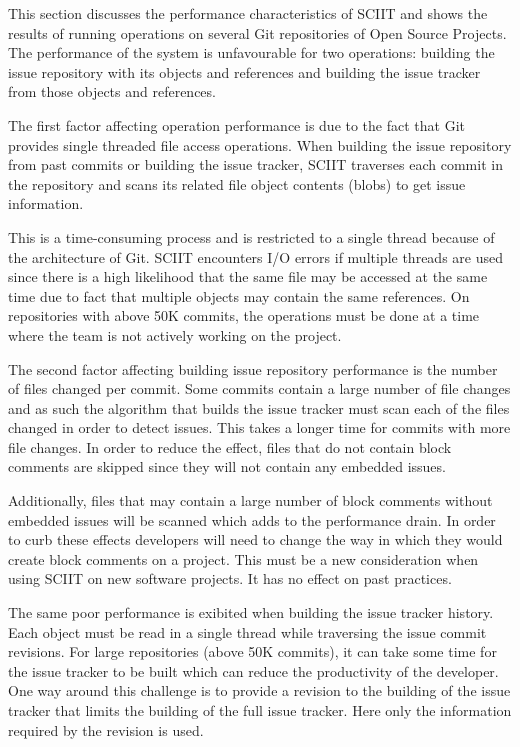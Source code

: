 \documentclass{mproj}
\begin{document}
This section discusses the performance characteristics of SCIIT and shows the results of running operations on several Git repositories of Open Source Projects. The performance of the system is unfavourable for two operations: building the issue repository with its objects and references and building the issue tracker from those objects and references. 

The first factor affecting operation performance is due to the fact that Git provides single threaded file access operations. When building the issue repository from past commits or building the issue tracker, SCIIT traverses each commit in the repository and scans its related file object contents (blobs) to get issue information. 

This is a time-consuming process and is restricted to a single thread because of the architecture of Git. SCIIT encounters I/O errors if multiple threads are used since there is a high likelihood that the same file may be accessed at the same time due to fact that multiple objects may contain the same references. On repositories with above 50K commits, the operations must be done at a time where the team is not actively working on the project.

The second factor affecting building issue repository performance is the number of files changed per commit. Some commits contain a large number of file changes and as such the algorithm that builds the issue tracker must scan each of the files changed in order to detect issues. This takes a longer time for commits with more file changes. In order to reduce the effect, files that do not contain block comments are skipped since they will not contain any embedded issues.

Additionally, files that may contain a large number of block comments without embedded issues will be scanned which adds to the performance drain. In order to curb these effects developers will need to change the way in which they would create block comments on a project. This must be a new consideration when using SCIIT on new software projects. It has no effect on past practices.


The same poor performance is exibited when building the issue tracker history. Each object must be read in a single thread while traversing the issue commit revisions. For large repositories (above 50K commits), it can take some time for the issue tracker to be built which can reduce the productivity of the developer. One way around this challenge is to provide a revision to the building of the issue tracker that limits the building of the full issue tracker. Here only the information required by the revision is used.
 
\end{document}

